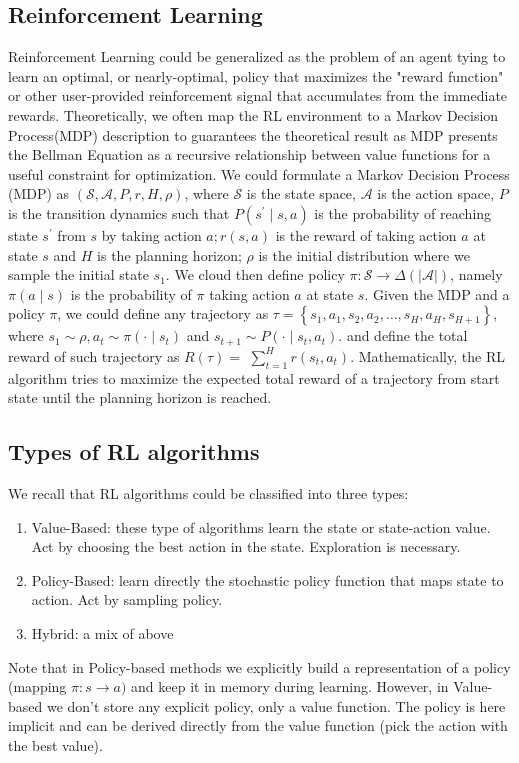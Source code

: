 \documentclass[11pt]{article}
\begin{document}
        
\subsection{Reinforcement Learning}
Reinforcement Learning could be generalized as the problem of an agent tying to learn an optimal, or nearly-optimal, policy that maximizes the "reward function" or other user-provided reinforcement signal that accumulates from the immediate rewards. Theoretically, we often map the RL environment to a Markov Decision Process(MDP) description to guarantees the theoretical result as MDP presents the Bellman Equation as a recursive relationship between value functions for a useful constraint for optimization. We could formulate a Markov Decision Process (MDP) as $(\mathcal{S}, \mathcal{A}, P, r, H, \rho)$, where $\mathcal{S}$ is the state space, $\mathcal{A}$ is the action space, $P$ is the transition dynamics such that $P\left(s^{\prime} \mid s, a\right)$ is the probability of reaching state $s^{\prime}$ from $s$ by taking action $a ; r(s, a)$ is the reward of taking action $a$ at state $s$ and $H$ is the planning horizon; $\rho$ is the initial distribution where we sample the initial state $s_{1} .$ We cloud then define policy $\pi: \mathcal{S} \rightarrow \Delta(|\mathcal{A}|)$, namely $\pi(a \mid s)$ is the probability of $\pi$ taking action $a$ at state $s$. Given the MDP and a policy $\pi$, we could define any trajectory as $\tau=\left\{s_{1}, a_{1}, s_{2}, a_{2}, \ldots, s_{H}, a_{H}, s_{H+1}\right\}$, where $s_{1} \sim \rho, a_{t} \sim \pi\left(\cdot \mid s_{t}\right)$ and $s_{t+1} \sim P\left(\cdot \mid s_{t}, a_{t}\right) .$ and define the total reward of such trajectory as $R(\tau)=$ $\sum_{t=1}^{H} r\left(s_{t}, a_{t}\right)$. Mathematically, the RL algorithm tries to maximize the expected total reward of a trajectory from start state until the planning horizon is reached.

\subsection{Types of RL algorithms}
We recall that RL algorithms could be classified into three types:
\begin{enumerate}
    \item Value-Based: these type of algorithms learn the state or state-action value. Act by choosing the best action in the state. Exploration is necessary. 
    \item Policy-Based: learn directly the stochastic policy function that maps state to action. Act by sampling policy.
    \item Hybrid: a mix of above 
\end{enumerate}
Note that in Policy-based methods we explicitly build a representation of a policy (mapping $\pi: s \rightarrow a)$ and keep it in memory during learning. However, in Value-based we don't store any explicit policy, only a value function. The policy is here implicit and can be derived directly from the value function (pick the action with the best value).
\end{document}
